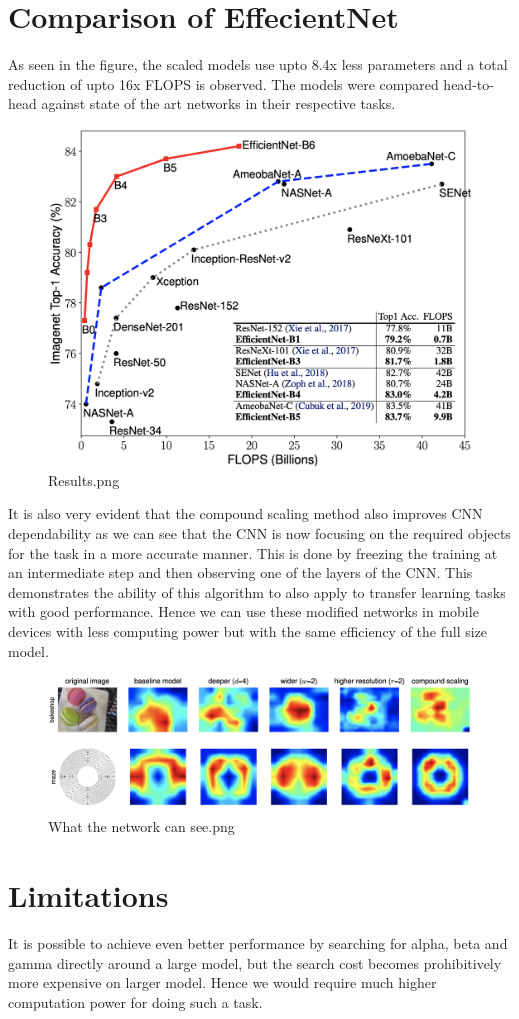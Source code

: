 \section{Comparison of EffecientNet}

As seen in the figure, the scaled models use upto 8.4x less parameters and a total reduction of upto 16x FLOPS is observed. The models were compared head-to-head against state of the art networks in their respective tasks.

\begin{figure}[htpb]
\centering
\includegraphics[width=\textwidth,height=\textheight,keepaspectratio]{../../static/Results.png}
\caption{Results.png}
\end{figure}It is also very evident that the compound scaling method also improves CNN dependability as we can see that the CNN is now focusing on the required objects for the task in a more accurate manner. This is done by freezing the training at an intermediate step and then observing one of the layers of the CNN. This demonstrates the ability of this algorithm to also apply to transfer learning tasks with good performance. Hence we can use these modified networks in mobile devices with less computing power but with the same efficiency of the full size model.
\begin{figure}[htpb]
\centering
\includegraphics[width=\textwidth,height=\textheight,keepaspectratio]{../../static/What the network can see.png}
\caption{What the network can see.png}
\end{figure}
\section{Limitations}

It is possible to achieve even better performance by searching for alpha, beta and gamma directly around a large model, but the search cost becomes prohibitively more expensive on larger model. Hence we would require much higher computation power for doing such a task.
